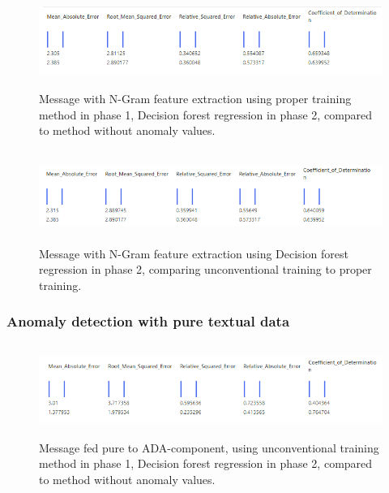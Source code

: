 \begin{figure}[htb]
    \centering
    \includegraphics[height=30mm,scale=0.5]{./appendices/msg_ngram_decision-forest-reg_proper2unanom.png}
    \caption{Message with N-Gram feature extraction
    using proper training method in phase 1,
        Decision forest regression in phase 2,
        compared to method without anomaly values.
        \label{fig:msg_ngram_decision-forest-reg_proper2unanom}}
\end{figure}

\begin{figure}[htb]
    \centering
    \includegraphics[height=30mm,scale=0.5]{./appendices/msg_ngram_decision-forest-reg_lewd2proper.png}
    \caption{Message with N-Gram feature extraction
    using Decision forest regression in phase 2,
        comparing unconventional training to proper training.
        \label{fig:msg_ngram_decision-forest-reg_lewd2proper}}
\end{figure}



\clearpage


\subsubsection*{Anomaly detection with pure textual data}

\begin{figure}[htb]
    \centering
    \includegraphics[height=30mm,scale=0.5]{./appendices/msg_pure_decision-forest-reg_lewd2unanom.png}
    \caption{Message fed pure to ADA-component,
    using unconventional training method in phase 1,
        Decision forest regression in phase 2,
        compared to method without anomaly values.
        \label{fig:msg_pure_decision-forest-reg_lewd2unanom}}
\end{figure}


